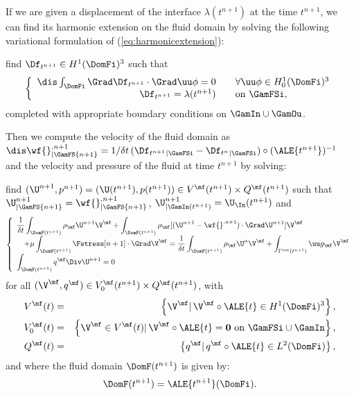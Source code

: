 If we are given a displacement of the interface  $\lambda(t^{n+1})$ at the
time $t^{n+1}$, we can find its harmonic extension on the fluid domain by solving
the  following variational formulation of
(\ref{eq:harmonicextension}):


find $\Df_{t^{n+1}} \in H^1(\DomFi)^3$ such that
\begin{equation} \label{eq:variationalvelocity2}
\left\{
\begin{array}{rcl}
\dis \int_{\DomFi} \Grad \Df_{t^{n+1}}\cdot \Grad \uu \phi  =  0 & & \forall \uu \phi \in H^1_0(\DomFi)^3\\
\Df_{t^{n+1}} = \lambda({t^{n+1}}) & & \text{on } \GamFSi,
\end{array}
\right.
\end{equation}
completed with appropriate boundary conditions  on $\GamIn\cup\GamOu$.

Then we compute the velocity of the fluid domain as $\dis \wf{}^{,n+1}_{|\GamFS{n+1}} = 1/\delta t\,(\Df_{t^{n+1}}{}_{|\GamFSi} - \Df_{t^n}{}_{|\GamFSi})
\circ(\ALE {t^{n+1}})^{-1}$ and the velocity and pressure of the fluid at time
$t^{n+1}$ by solving:

find $(\U^{n+1},p^{n+1}) = (\U(t^{n+1}),p(t^{n+1})) \in V^\mf(t^{n+1})\times Q^\mf(t^{n+1})$ such
that $\U^{n+1}_{|\GamFS{n+1}} =  \wf{}^{,n+1}_{|\GamFS{n+1}}$,
$\U^{n+1}_{|\GamIn(t^{n+1})} =  \U_\In(t^{n+1})$
and
\begin{equation} \label{eq:variationalfluid}
\left\{
\begin{array}{l}
\displaystyle \frac{1}{\delta t}\int_{\DomF(t^{n+1})} \rho_\mf \U^{n+1}\V^\mf
+ \displaystyle \int_{\DomF(t^{n+1})}\rho_\mf [(\U^{n+1} -  \wf{}^{,n+1})\cdot \Grad \U^{n+1}]\V^\mf\\ \quad
\displaystyle + \mu\int_{\DomF(t^{n+1})} \Fstress[{n+1}] \cdot \Grad \V^{\mf}
= \displaystyle \frac{1}{\delta t} \int_{\DomF(t^{n+1})} \rho_\mf \U^n \V^\mf +
\int_{\Gamma^{\mathrm{out}}(t^{n+1})} \uu g_{\mf} \V^\mf \\
\displaystyle \int_{\DomF(t^{n+1})} q^\mf \Div \U^{n+1}  = 0
\end{array}
\right.
\end{equation}
for all $(\V^\mf,q^\mf) \in V_0^\mf(t^{n+1}) \times Q^\mf(t^{n+1})$, with
\begin{eqnarray*}
V^\mf(t) & = & \left\{\V^\mf \vert \,   \V^\mf \circ \ALE {t}  \in H^1(\DomFi)^3\right\}, \\
V_0^\mf(t) & = & \left\{\V^\mf \in V^\mf(t) \vert \,\V^\mf  \circ \ALE {t}
= \mathbf{0} \mbox { on } \GamFSi \cup \GamIn \right\}, \\
Q^\mf (t)& = & \left\{q^\mf  \vert \, q^\mf \circ \ALE {t} \in L^2(\DomFi)\right\},
\end{eqnarray*}
and where the fluid domain $\DomF(t^{n+1})$ is given by:
\begin{equation*}
\DomF(t^{n+1})  = \ALE {t^{n+1}}(\DomFi).
\end{equation*}

